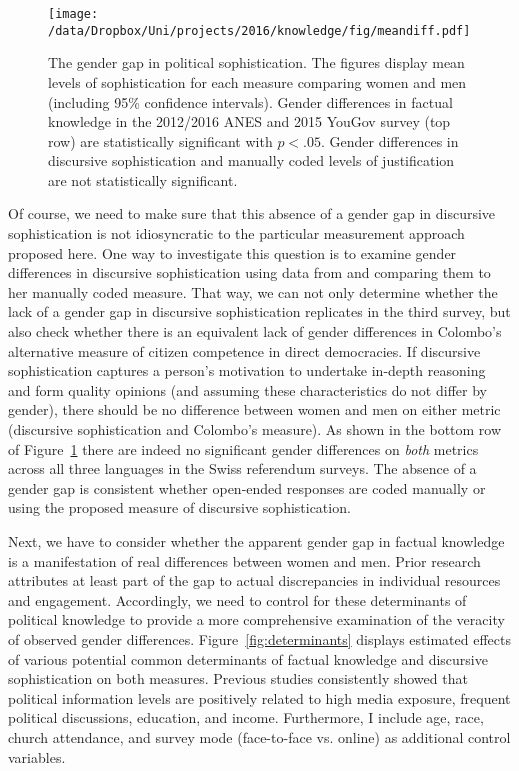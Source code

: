 \begin{figure}[h]\centering
	\texttt{[image: /data/Dropbox/Uni/projects/2016/knowledge/fig/meandiff.pdf]}
	\caption[The gender gap in political sophistication]{The gender gap in political sophistication. The figures display mean levels of sophistication for each measure comparing women and men (including 95\% confidence intervals). Gender differences in factual knowledge in the 2012/2016 ANES and 2015 YouGov survey (top row) are statistically significant with $p<.05$. Gender differences in discursive sophistication and manually coded levels of justification \citep{colombo2016justifications} are not statistically significant.}\label{fig:meandiff}
\end{figure}

Of course, we need to make sure that this absence of a gender gap in discursive sophistication is not idiosyncratic to the particular measurement approach proposed here. One way to investigate this question is to examine gender differences in discursive sophistication using data from \citet{colombo2016justifications} and comparing them to her manually coded measure. That way, we can not only determine whether the lack of a gender gap in discursive sophistication replicates in the third survey, but also check whether there is an equivalent lack of gender differences in Colombo's alternative measure of citizen competence in direct democracies. If discursive sophistication captures a person's motivation to undertake in-depth reasoning and form quality opinions (and assuming these characteristics do not differ by gender), there should be no difference between women and men on either metric (discursive sophistication and Colombo's measure). As shown in the bottom row of Figure~\ref{fig:meandiff} there are indeed no significant gender differences on \textit{both} metrics across all three languages in the Swiss referendum surveys. The absence of a gender gap is consistent whether open-ended responses are coded manually or using the proposed measure of discursive sophistication.

Next, we have to consider whether the apparent gender gap in factual knowledge is a manifestation of real differences between women and men. Prior research attributes at least part of the gap to actual discrepancies in individual resources and engagement. Accordingly, we need to control for these determinants of political knowledge to provide a more comprehensive examination of the veracity of observed gender differences. Figure~\ref{fig:determinants} displays estimated effects of various potential common determinants of factual knowledge and discursive sophistication on both measures. Previous studies consistently showed that political information levels are positively related to high media exposure, frequent political discussions, education, and income. Furthermore, I include age, race, church attendance, and survey mode (face-to-face vs. online) as additional control variables.

